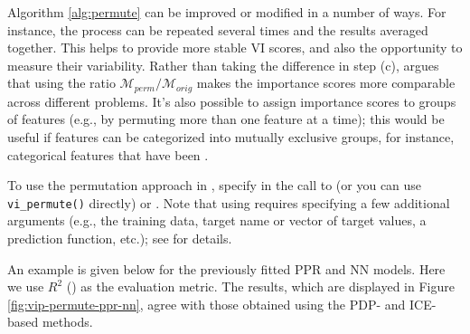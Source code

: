 Algorithm \ref{alg:permute} can be improved or modified in a number of
ways. For instance, the process can be repeated several times and the
results averaged together. This helps to provide more stable VI scores,
and also the opportunity to measure their variability. Rather than
taking the difference in step (c), \citet[sec. 5.5.4]{molnar-2019-iml}
argues that using the ratio \(\mathcal{M}_{perm} / \mathcal{M}_{orig}\)
makes the importance scores more comparable across different problems.
It's also possible to assign importance scores to groups of features
(e.g., by permuting more than one feature at a time); this would be
useful if features can be categorized into mutually exclusive groups,
for instance, categorical features that have been .

To use the permutation approach in , specify
 in the call to  (or you can use
\texttt{vi\_permute()} directly) or . Note that using
 requires specifying a few additional arguments
(e.g., the training data, target name or vector of target values, a
prediction function, etc.); see  for details.

An example is given below for the previously fitted PPR and NN models.
Here we use \(R^2\) () as the evaluation
metric. The results, which are displayed in Figure
\ref{fig:vip-permute-ppr-nn}, agree with those obtained using the PDP-
and ICE-based methods.

